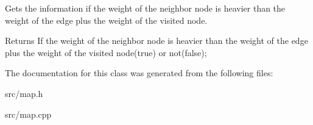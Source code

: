 Gets the information if the weight of the neighbor node is heavier than the weight of the edge plus the weight of the visited node. 

\begin{DoxyReturn}{Returns}
If the weight of the neighbor node is heavier than the weight of the edge plus the weight of the visited node(true) or not(false); 
\end{DoxyReturn}


The documentation for this class was generated from the following files\+:\begin{DoxyCompactItemize}
\item 
src/map.\+h\item 
src/map.\+cpp\end{DoxyCompactItemize}
